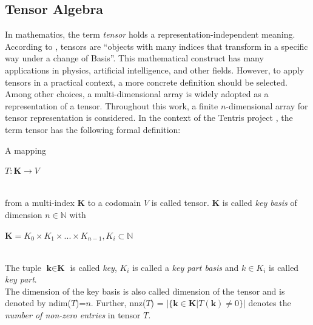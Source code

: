 \subsection{Tensor Algebra}
\label{sec:tensor_algebra}
In mathematics, the term \textit{tensor} holds a representation-independent meaning. According to \cite{rent}, tensors are “objects with many indices that transform in a specific way under a change of
Basis”. This mathematical construct has many applications in physics, artificial intelligence, and other fields. However, to apply tensors in a practical context, a more concrete definition should be selected. Among other choices, a multi-dimensional array is widely adopted as a representation of a tensor. Throughout this work, a finite $n$-dimensional array for tensor representation is considered.
In the context of the Tentris project \cite{tentris2020}, the term tensor has the following formal definition:

\begin{definition}[Tensor]
A mapping\\
\centerline{$T: \textbf{K} \to V$}\\
from a multi-index $\textbf{K}$ to a codomain $V$ is called tensor. $\textbf{K}$ is called \textit{key basis} of dimension $n \in \mathbb{N}$ with \\
\centerline{ $\textbf{K} = K_0 \times K_1 \times ... \times K_{n-1}, K_i \subset \mathbb{N}$ } \\
The tuple $\textbf{k} \in \textbf{K}$ is called \textit{key}, $K_i$ is called a \textit{key part basis} and $k \in K_i$ is called \textit{key part}.\\
The dimension of the key basis is also called dimension of the tensor and is denoted by ndim($T$)=$n$. Further, nnz($T$) = $|\{\textbf{k} \in \textbf{K} | T(\textbf{k})  \neq 0\}|$ denotes the \textit{ number of non-zero entries} in tensor $T$.
\end{definition} 

